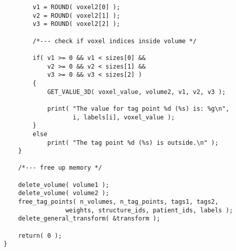 {\begin{verbatim}
        v1 = ROUND( voxel2[0] );
        v2 = ROUND( voxel2[1] );
        v3 = ROUND( voxel2[2] );

        /*--- check if voxel indices inside volume */
     
        if( v1 >= 0 && v1 < sizes[0] &&
            v2 >= 0 && v2 < sizes[1] &&
            v3 >= 0 && v3 < sizes[2] )
        {
            GET_VALUE_3D( voxel_value, volume2, v1, v2, v3 );

            print( "The value for tag point %d (%s) is: %g\n",
                   i, labels[i], voxel_value );
        }
        else
            print( "The tag point %d (%s) is outside.\n" );
    }

    /*--- free up memory */

    delete_volume( volume1 );
    delete_volume( volume2 );
    free_tag_points( n_volumes, n_tag_points, tags1, tags2,
                 weights, structure_ids, patient_ids, labels );
    delete_general_transform( &transform );

    return( 0 );
}
\end{verbatim}
}


